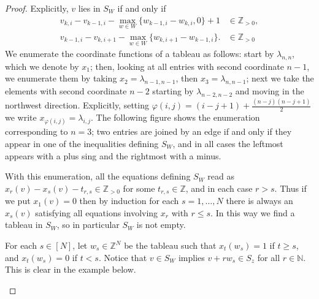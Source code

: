 \documentclass[11pt,fleqn]{article}
\newcommand\NN{\mathbb N}
\newcommand\ZZ{\mathbb Z}
\renewcommand\phi{\varphi}
\begin{document}
\begin{proof}
Explicitly, $v$ lies in $S_W$ if and only if
\begin{align*}
v_{k,i} - v_{k-1,i} - \max_{w \in W}\{w_{k-1,i} - w_{k,i}, 0\} +1 
	&\in \ZZ_{> 0}, \\
v_{k-1,i} - v_{k,i+1} - \max_{w \in W}\{w_{k,i+1} - w_{k-1,i}\}.
	&\in \ZZ_{>0} 
\end{align*}
We enumerate the coordinate functions of a tableau as follows: start by 
$\lambda_{n,n}$, which we denote by $x_1$; then, looking at all entries with 
second coordinate $n-1$, we enumerate them by taking $x_2 = 
\lambda_{n-1,n-1}$, then $x_3 = \lambda_{n,n-1}$; next we take the elements 
with second coordinate $n-2$ starting by $\lambda_{n-2,n-2}$ and moving in the 
northwest direction. Explicitly, setting $\phi(i,j) = (i-j+1) + 
\frac{(n-j)(n-j+1)}{2}$ we write $x_{\phi(i,j)} = \lambda_{i,j}$. The 
following figure shows the enumeration corresponding to $n = 3$; two entries 
are joined by an edge if and only if they appear in one of the inequalities 
defining $S_W$, and in all cases the leftmost appears with a plus sing and the 
rightmost with a minus.


With this enumeration, all the equations defining $S_W$ read as $x_r(v) - 
x_s(v) - t_{r,s} \in \ZZ_{>0}$ for some $t_{r,s} \in \ZZ$, and in each case 
$r > s$. Thus if we put $x_1(v) = 0$ then by induction for each $s = 1, 
\ldots, N$ there is always an $x_s(v)$ satisfying all equations involving 
$x_r$ with $r\leq s$. In this way we find a tableau in $S_W$, so in particular 
$S_W$ is not empty. 

For each $s \in [N]$, let $w_s \in \ZZ^N$ be the tableau such that $x_t(w_s) 
= 1$ if $t \geq s$, and $x_t(w_s) = 0$ if $t < s$. Notice that $v \in S_W$ 
implies $v + r w_s \in S_z$ for all $r \in \NN$. This is clear in the example 
below.
\begin{figure}[h]
\centering
{}
\end{figure}
\end{proof}
\end{document}
